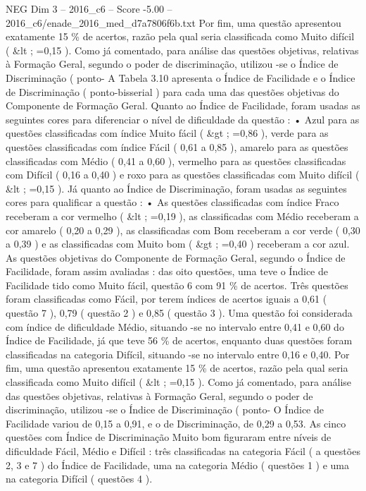 \begin{textsample}{NEG Dim 3 – 2016\_c6 – Score -5.00 – 2016\_c6/enade\_2016\_med\_d7a7806f6b.txt}
Por fim, uma questão apresentou exatamente 15 \% de acertos, razão pela qual seria classificada como Muito difícil ( \&lt ; =0,15 ).
Como já comentado, para análise das questões objetivas, relativas à Formação Geral, segundo o poder de discriminação, utilizou -se o Índice de Discriminação ( ponto- A Tabela 3.10 apresenta o Índice de Facilidade e o Índice de Discriminação ( ponto-bisserial ) para cada uma das questões objetivas do Componente de Formação Geral.
Quanto ao Índice de Facilidade, foram usadas as seguintes cores para diferenciar o nível de dificuldade da questão : • Azul para as questões classificadas com índice Muito fácil ( \&gt ; =0,86 ), verde para as questões classificadas com índice Fácil ( 0,61 a 0,85 ), amarelo para as questões classificadas com Médio ( 0,41 a 0,60 ), vermelho para as questões classificadas com Difícil ( 0,16 a 0,40 ) e roxo para as questões classificadas com Muito difícil ( \&lt ; =0,15 ).
Já quanto ao Índice de Discriminação, foram usadas as seguintes cores para qualificar a questão : • As questões classificadas com índice Fraco receberam a cor vermelho ( \&lt ; =0,19 ), as classificadas com Médio receberam a cor amarelo ( 0,20 a 0,29 ), as classificadas com Bom receberam a cor verde ( 0,30 a 0,39 ) e as classificadas com Muito bom ( \&gt ; =0,40 ) receberam a cor azul.
As questões objetivas do Componente de Formação Geral, segundo o Índice de Facilidade, foram assim avaliadas : das oito questões, uma teve o Índice de Facilidade tido como Muito fácil, questão 6 com 91 \% de acertos.
Três questões foram classificadas como Fácil, por terem índices de acertos iguais a 0,61 ( questão 7 ), 0,79 ( questão 2 ) e 0,85 ( questão 3 ).
Uma questão foi considerada com índice de dificuldade Médio, situando -se no intervalo entre 0,41 e 0,60 do Índice de Facilidade, já que teve 56 \% de acertos, enquanto duas questões foram classificadas na categoria Difícil, situando -se no intervalo entre 0,16 e 0,40.
Por fim, uma questão apresentou exatamente 15 \% de acertos, razão pela qual seria classificada como Muito difícil ( \&lt ; =0,15 ).
Como já comentado, para análise das questões objetivas, relativas à Formação Geral, segundo o poder de discriminação, utilizou -se o Índice de Discriminação ( ponto- O Índice de Facilidade variou de 0,15 a 0,91, e o de Discriminação, de 0,29 a 0,53.
As cinco questões com Índice de Discriminação Muito bom figuraram entre níveis de dificuldade Fácil, Médio e Difícil : três classificadas na categoria Fácil ( a questões 2, 3 e 7 ) do Índice de Facilidade, uma na categoria Médio ( questões 1 ) e uma na categoria Difícil ( questões 4 ).

\end{textsample}
